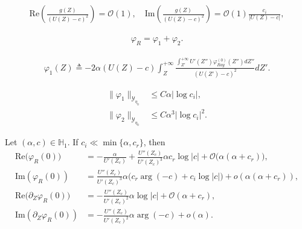 \documentclass[10pt,a4paper]{amsart}
\begin{document}
		\begin{align}\label{g-part}
			\text{Re}\left(\frac{g(Z)}{(U(Z)-c)^2}\right)=\mathcal{O}(1),\quad  \text{Im}\left(\frac{g(Z)}{(U(Z)-c)^2}\right)%
			=\mathcal{O}(1)\frac{c_i}{|U(Z)-c|},
		\end{align}

				\begin{align}\label{def-phi-R}
					\varphi_R=\varphi_1+\varphi_2.
				\end{align} 

				\begin{align}\label{def-phi1}
					\varphi_1(Z)\triangleq-2\alpha(U(Z)-c)\int_Z^{+\infty} \frac{\int_{Z'}^{+\infty}U'(Z'')\varphi_{Ray}^{(0)}(Z'')dZ''}{(U(Z')-c)^{2}}dZ'.
				\end{align}

				\begin{align}
					\|\varphi_1\|_{\mathcal{Y}_{\eta_0}}&\leq C\alpha|\log c_i|,\label{vphi1}\\
					\|\varphi_2\|_{\mathcal{Y}_{\eta_0}}&\leq C\alpha^3|\log c_i|^2.\label{vphi2}
				\end{align}

				\begin{lemma}\label{lem:ray-R-asy}
					Let $(\alpha,c)\in \mathbb{H}_1$. If $c_i\ll \min\{\alpha, c_r\}$, then
					\begin{align}
						\mathrm{Re}\big(\varphi_R(0)\big) &= -\frac{\alpha}{U'(Z_c)}+\frac{U''(Z_c)}{U'(Z_c)^3} \alpha c_r\log|c|+\mathcal{O}\big(\alpha (\alpha+c_r)\big),\label{r1}\\
						\mathrm{Im}\left(\varphi_{R}(0)\right)&=\frac{ U''(Z_c)}{U'(Z_c)^3}
						\alpha\big(c_r\arg(-c)+c_i\log|c|\big)+o(\alpha (\alpha+c_r)),\label{r2}\\
						\mathrm{Re}\big(\partial_Z\varphi_R(0)\big)&=-\frac{U''(Z_c)}{U'(Z_c)^2}\alpha \log|c|+\mathcal{O}(\alpha+c_r),\label{r3}\\
						\mathrm{Im}\left(\partial_Z\varphi_{R}(0) \right)&=-\frac{ U''(Z_c)}{U'(Z_c)^2}\alpha\arg(-c) +o(\alpha).\label{r4}
					\end{align}
				\end{lemma}
\end{document}
